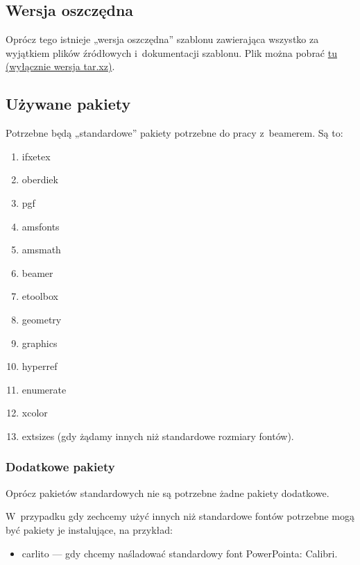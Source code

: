 \subsection{Wersja oszczędna}

Oprócz tego istnieje „wersja oszczędna” szablonu zawierająca wszystko za wyjątkiem plików źródłowych i~dokumentacji szablonu. Plik można pobrać \href{https://kmim.wm.pwr.edu.pl/myszka/logotyp/nowy_szablon_maly.tar.xz}{tu (wyłącznie wersja tar.xz)}.

\subsection{Używane pakiety}

Potrzebne będą „standardowe” pakiety potrzebne do pracy z~beamerem. Są to:
\begin{enumerate}
 \item
       ifxetex
 \item
       oberdiek
 \item
       pgf
 \item
       amsfonts
 \item
       amsmath
 \item
       beamer
 \item
       etoolbox
 \item
       geometry
 \item
       graphics
 \item
       hyperref
 \item
       enumerate
 \item
       xcolor
 \item
       extsizes (gdy żądamy innych niż standardowe rozmiary fontów).
\end{enumerate}
\begin{frame}
 \frametitle{Dodatkowe pakiety}

 Oprócz pakietów standardowych  nie są potrzebne żadne pakiety dodatkowe.

 W~przypadku gdy zechcemy użyć innych niż standardowe fontów potrzebne mogą być pakiety je instalujące, na przykład:
 \begin{itemize}
  \item
        carlito — gdy chcemy naśladować standardowy font PowerPointa: Calibri.
 \end{itemize}
\end{frame}

